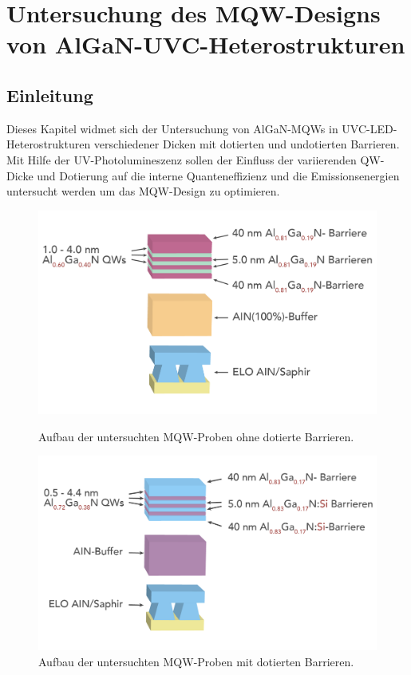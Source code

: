 \thispagestyle{fancy}
\justifying
\chapter{Untersuchung des MQW-Designs von AlGaN-UVC-Heterostrukturen}
\label{chap:mqw}
\section{Einleitung}
Dieses Kapitel widmet sich der Untersuchung von AlGaN-MQWs in UVC-LED-Heterostrukturen verschiedener Dicken mit dotierten und undotierten Barrieren. Mit Hilfe der UV-Photolumineszenz sollen der Einfluss der variierenden QW-Dicke und Dotierung auf die interne Quanteneffizienz und die Emissionsenergien untersucht werden um das MQW-Design zu optimieren.
\begin{figure}[H]
  \centering
  \begin{minipage}[t]{0.49\textwidth}
    \centering
    \includegraphics[width=\textwidth]{Bilder/MQWdickenSerie/undotiert}
		\caption{Aufbau der untersuchten MQW-Proben ohne dotierte Barrieren.}
    \label{fig:undotiert}
  \end{minipage}
	\hfill
  \begin{minipage}[t]{0.49\textwidth}
    \centering
    \includegraphics[width=\linewidth]{Bilder/MQWdickenSerie/dotiert}
		\caption{Aufbau der untersuchten MQW-Proben mit dotierten Barrieren.}
    \label{fig:dotiert}
  \end{minipage}
\end{figure}
